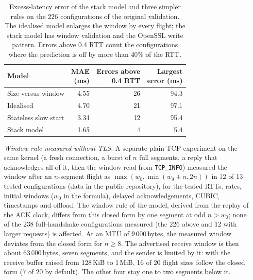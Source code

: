 \documentclass[preprint,12pt]{elsarticle}
\begin{document}
\begin{table}[t]
\centering\small
\caption{Excess-latency error of the stack model and three simpler rules on the 226 configurations of the original validation. The idealised model enlarges the window by every flight; the stack model has window validation and the OpenSSL write pattern. Errors above 0.4 RTT count the configurations where the prediction is off by more than 40\% of the RTT.}
\label{tab:baselines}
\begin{tabular}{@{}lrrr@{}}
\toprule
Model & \shortstack[r]{MAE\\(ms)} & \shortstack[r]{Errors above\\0.4 RTT} & \shortstack[r]{Largest\\error (ms)}\\
\midrule
Size versus window & 4.55 & 26 & 94.3\\
Idealised & 4.70 & 21 & 97.1\\
Stateless slow start & 3.34 & 12 & 95.4\\
Stack model & 1.65 & 4 & 5.4\\
\bottomrule
\end{tabular}
\end{table}

\emph{Window rule measured without TLS.} A separate plain-TCP experiment on the same kernel (a fresh connection, a burst of $n$ full segments, a reply that acknowledges all of it, then the window read from \texttt{TCP\_INFO}) measured the window after an $n$-segment flight as $\max(w_0,\min(w_0+n,2n))$ in 12 of 13 tested configurations (data in the public repository), for the tested RTTs, rates, initial windows ($w_0$ in the formula), delayed acknowledgements, CUBIC, timestamps and offload. The window rule of the model, derived from the replay of the ACK clock, differs from this closed form by one segment at odd $n>w_0$; none of the 238 full-handshake configurations measured (the 226 above and 12 with larger requests) is affected. At an MTU of 9\,000\,bytes, the measured window deviates from the closed form for $n\ge 8$. The advertised receive window is then about 63\,000\,bytes, seven segments, and the sender is limited by it: with the receive buffer raised from 128\,KiB to 1\,MiB, 16 of 20 flight sizes follow the closed form (7 of 20 by default). The other four stay one to two segments below it.
\end{document}
